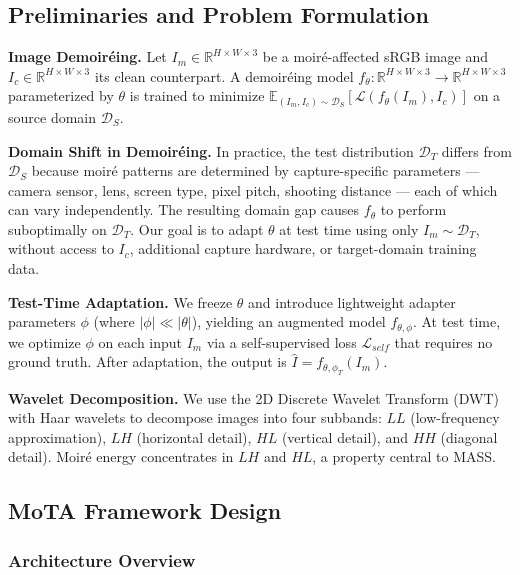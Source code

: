 \documentclass[review,10pt]{elsarticle}
\begin{document}
\subsection{Preliminaries and Problem Formulation}

\textbf{Image Demoir\'{e}ing.} Let $I_m \in \mathbb{R}^{H \times W \times 3}$ be a moir\'{e}-affected sRGB image and $I_c \in \mathbb{R}^{H \times W \times 3}$ its clean counterpart. A demoir\'{e}ing model $f_\theta: \mathbb{R}^{H \times W \times 3} \to \mathbb{R}^{H \times W \times 3}$ parameterized by $\theta$ is trained to minimize $\mathbb{E}_{(I_m, I_c) \sim \mathcal{D}_S}[\mathcal{L}(f_\theta(I_m), I_c)]$ on a source domain $\mathcal{D}_S$.

\textbf{Domain Shift in Demoir\'{e}ing.} In practice, the test distribution $\mathcal{D}_T$ differs from $\mathcal{D}_S$ because moir\'{e} patterns are determined by capture-specific parameters --- camera sensor, lens, screen type, pixel pitch, shooting distance --- each of which can vary independently. The resulting domain gap causes $f_\theta$ to perform suboptimally on $\mathcal{D}_T$. Our goal is to adapt $\theta$ at test time using only $I_m \sim \mathcal{D}_T$, without access to $I_c$, additional capture hardware, or target-domain training data.

\textbf{Test-Time Adaptation.} We freeze $\theta$ and introduce lightweight adapter parameters $\phi$ (where $|\phi| \ll |\theta|$), yielding an augmented model $f_{\theta,\phi}$. At test time, we optimize $\phi$ on each input $I_m$ via a self-supervised loss $\mathcal{L}_{self}$ that requires no ground truth. After adaptation, the output is $\hat{I} = f_{\theta,\phi_T}(I_m)$.

\textbf{Wavelet Decomposition.} We use the 2D Discrete Wavelet Transform (DWT) with Haar wavelets to decompose images into four subbands: $LL$ (low-frequency approximation), $LH$ (horizontal detail), $HL$ (vertical detail), and $HH$ (diagonal detail). Moir\'{e} energy concentrates in $LH$ and $HL$, a property central to MASS.

\subsection{MoTA Framework Design}

\subsubsection{Architecture Overview}
\end{document}
